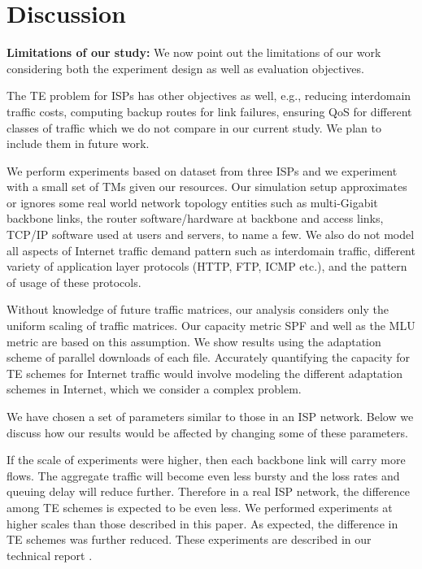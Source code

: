 \section{Discussion}
\label{sec:discuss}

\noindent\textbf{Limitations of our study:} We now point out the limitations of our work considering both the experiment design as well as evaluation objectives.

The TE problem for ISPs has other objectives as well, e.g., reducing interdomain traffic costs, computing backup routes for link failures,  ensuring QoS for different classes of traffic \cite{RFC3272} which we do not compare in our current study. We plan to include them in future work. 

 We perform experiments based on dataset from three ISPs and we experiment with a small set of TMs given our resources. Our simulation setup approximates or ignores some real world network topology entities such as multi-Gigabit backbone links, the router software/hardware at backbone and access links, TCP/IP software used at users and servers, to name a few.  We also do not model all aspects of Internet traffic demand pattern such as interdomain traffic, different variety of application layer protocols (HTTP, FTP, ICMP etc.), and the pattern of usage of these protocols.

 Without knowledge of future traffic matrices, our analysis considers only the uniform scaling of traffic matrices. Our capacity metric SPF and well as the MLU metric are based on this assumption. We show results using the adaptation scheme of parallel downloads of each file.  Accurately quantifying the capacity for TE schemes for Internet traffic would involve modeling the different adaptation schemes in Internet, which we consider a complex problem. 




 We have chosen a set of parameters similar to those in an ISP network. Below we discuss how our results would be affected by changing some of these parameters.

If the scale of experiments were higher, then each backbone link will carry more flows. The aggregate traffic  will become even less bursty and the loss rates and queuing delay will reduce further. Therefore in a real ISP network, the difference among TE schemes is expected to be even less. We  performed experiments at higher scales than those described in this paper. As expected, the difference in TE schemes was further reduced. These experiments are described in our technical report \cite{TR}.

